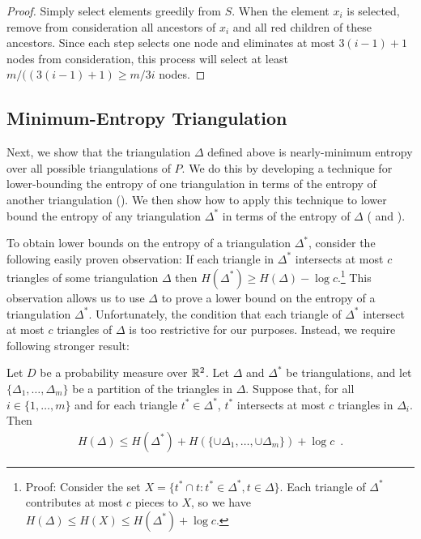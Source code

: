 \documentclass[lotsofwhite]{patmorin}
\begin{document}
\begin{proof}
Simply select elements greedily from $S$. When the element $x_i$ is
selected, remove from consideration all ancestors of $x_i$ and all red
children of these ancestors.  Since each step selects one node and 
eliminates at most $3(i-1)+1$ nodes from consideration, this process 
will select at least $m/((3(i-1)+1) \ge m/3i$ nodes.
\end{proof}

\subsection{Minimum-Entropy Triangulation}

Next, we show that the triangulation $\Delta$ defined above is
nearly-minimum entropy over all possible triangulations of $P$.  We do
this by developing a technique for lower-bounding the entropy of one
triangulation in terms of the entropy of another triangulation
().  We then show how to apply this technique to lower
bound the entropy of any triangulation $\Delta^*$ in terms of the
entropy of $\Delta$ ( and ).
  
To obtain lower bounds on the entropy of a triangulation $\Delta^*$,
consider the following easily proven observation: If each triangle in
$\Delta^*$ intersects at most $c$ triangles of some triangulation
$\Delta$ then $H(\Delta^*) \ge H(\Delta) - \log c$.\footnote{Proof:
Consider the set $X=\{ t^*\cap t : t^*\in\Delta^*, t\in \Delta\}$.
Each triangle of $\Delta^*$ contributes at most $c$ pieces to $X$, so
we have $H(\Delta) \le H(X) \le H(\Delta^*) + \log c$.}  This
observation allows us to use $\Delta$ to prove a lower bound on the
entropy of a triangulation $\Delta^*$.  Unfortunately, the condition
that each triangle of $\Delta^*$ intersect at most $c$ triangles of
$\Delta$ is too restrictive for our purposes.  Instead, we require
following stronger result:

\begin{lem}
Let $D$ be a probability measure over $\mathbb{R}^2$.  Let $\Delta$ and
$\Delta^*$ be triangulations, and let $\{\Delta_1,\ldots,\Delta_m\}$
be a partition of the triangles in $\Delta$.  Suppose that, for all
$i\in\{1,\ldots,m\}$ and for each triangle $t^*\in\Delta^*$, $t^*$
intersects at most $c$ triangles in $\Delta_i$.  Then
\begin{eqnarray*}
   H(\Delta) \le 
	 H(\Delta^*) + H(\{\cup\Delta_1,\ldots,\cup\Delta_m\}) + \log c
 \enspace . 
\end{eqnarray*}
\end{lem}
\end{document}
